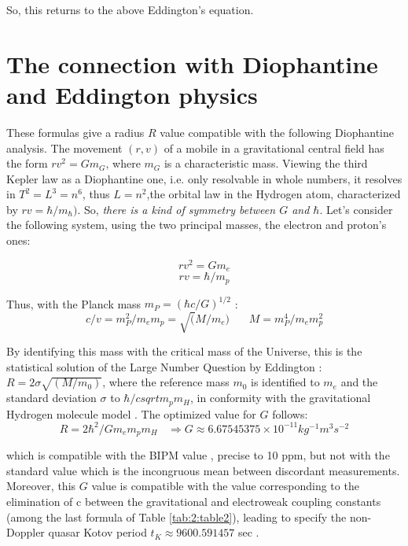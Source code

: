 \documentclass[a4paper,9pt]{article}
\begin{document}
So, this returns to the above Eddington's equation.


    \section{The connection with Diophantine and Eddington physics}

These formulas give a radius $R$ value compatible with the following Diophantine analysis. The movement $(r,v)$ of a mobile in a gravitational central field has the form $r v^2 = Gm_G$, where $m_G$ is a characteristic mass. Viewing the third Kepler law as a Diophantine one, i.e. only resolvable in whole numbers, it resolves in  $T^2 = L^3 = n^6$, thus $L = n^2$,the orbital law in the Hydrogen atom, characterized by $rv = \hbar/m_{\hbar})$. So, \textit{there is a kind of symmetry between $G$ and $\hbar$}. Let's consider the following system, using the two principal masses, the electron and proton's ones: 

\begin{equation}
  r v^2 = Gm_e
  \end{equation}
  \begin{equation}
r v = \hbar/m_p  
\end{equation}

Thus, with the Planck mass $m_P = (\hbar c/G)^{1/2}$ : 
\begin{equation}
c/v = m_P^2/m_em_p = \sqrt(M/m_e)~~~~~~~~   M = m_P^4/m_em_p^2
\end{equation}

By identifying this mass with the critical mass of the Universe, this is the statistical solution \cite{Durham} of the Large Number Question by Eddington  : $R = 2 \sigma \sqrt{(M/m_0)}$, where the reference mass $m_0$ is identified to $m_e$ and the standard deviation $\sigma$ to $\hbar/csqrt{m_pm_H}$, in conformity with the gravitational Hydrogen molecule model \cite{Sanchez}. The optimized value for $G$ follows:
\begin{equation}
R = 2\hbar^2/Gm_em_pm_H  ~~~~  \Rightarrow G \approx 6.67545375 \times 10^{-11}  kg^{-1}m^{3}s^{-2}    
\end{equation}

which is compatible with the BIPM value \cite{Quinn}, precise to 10 ppm, but not with the standard value \cite{Nist} which is the incongruous mean between discordant measurements. Moreover, this $G$ value is compatible with the value corresponding to the elimination of c between the gravitational and electroweak coupling constants (among the last formula of Table \ref{tab:2:table2}), leading to specify the non-Doppler quasar Kotov period $t_K \approx 9600.591457$ sec \cite{Sanchez}.
\end{document}
